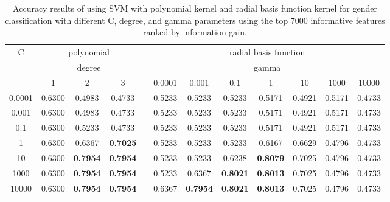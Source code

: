 \documentclass[a4paper]{llncs}
\begin{document}
\begin{table}[!htbp]
\centering
\begin{tabular}{|c|c|c|c|c|c|c|c|c|c|c|c|}
\cline{1-4} \cline{6-12}
\multirow{3}{*}{C} & \multicolumn{3}{c|}{polynomial}            &  & \multicolumn{7}{c|}{radial basis function}                                              \\ \cline{2-4} \cline{6-12} 
                   & \multicolumn{3}{c|}{degree}                &  & \multicolumn{7}{c|}{gamma}                                                              \\ \cline{2-4} \cline{6-12} 
                   & 1      & 2               & 3               &  & 0.0001 & 0.001           & 0.1             & 1               & 10     & 1000   & 10000  \\ \cline{1-4} \cline{6-12} 
0.0001             & 0.6300 & 0.4983          & 0.4733          &  & 0.5233 & 0.5233          & 0.5233          & 0.5171          & 0.4921 & 0.5171 & 0.4733 \\ \cline{1-4} \cline{6-12} 
0.001              & 0.6300 & 0.4983          & 0.4733          &  & 0.5233 & 0.5233          & 0.5233          & 0.5171          & 0.4921 & 0.5171 & 0.4733 \\ \cline{1-4} \cline{6-12} 
0.1                & 0.6300 & 0.5233          & 0.4733          &  & 0.5233 & 0.5233          & 0.5233          & 0.5171          & 0.4921 & 0.5171 & 0.4733 \\ \cline{1-4} \cline{6-12} 
1                  & 0.6300 & 0.6367          & \textbf{0.7025} &  & 0.5233 & 0.5233          & 0.5233          & 0.6167          & 0.6629 & 0.4796 & 0.4733 \\ \cline{1-4} \cline{6-12} 
10                 & 0.6300 & \textbf{0.7954} & \textbf{0.7954} &  & 0.5233 & 0.5233          & 0.6238          & \textbf{0.8079} & 0.7025 & 0.4796 & 0.4733 \\ \cline{1-4} \cline{6-12} 
1000               & 0.6300 & \textbf{0.7954} & \textbf{0.7954} &  & 0.5233 & 0.6367          & \textbf{0.8021} & \textbf{0.8013} & 0.7025 & 0.4796 & 0.4733 \\ \cline{1-4} \cline{6-12} 
10000              & 0.6300 & \textbf{0.7954} & \textbf{0.7954} &  & 0.6367 & \textbf{0.7954} & \textbf{0.8021} & \textbf{0.8013} & 0.7025 & 0.4796 & 0.4733 \\ \cline{1-4} \cline{6-12} 
\end{tabular}
\caption{Accuracy results of using SVM with polynomial kernel and radial basis function kernel for gender classification with different C, degree, and gamma parameters using the top 7000 informative features ranked by information gain.}
\label{table:SVMPolyAndRBFGender}
\end{table}
\end{document}
